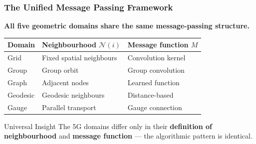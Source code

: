 \begin{frame}[fragile]\frametitle{The Unified Message Passing Framework}

\begin{center}
\textbf{All five geometric domains share the same message-passing structure.}
\end{center}

\begin{center}
\begin{tabular}{lll}
\hline
\textbf{Domain} & \textbf{Neighbourhood $\mathcal{N}(i)$} & \textbf{Message function $M$} \\
\hline
Grid & Fixed spatial neighbours & Convolution kernel \\
Group & Group orbit & Group convolution \\
Graph & Adjacent nodes & Learned function \\
Geodesic & Geodesic neighbours & Distance-based \\
Gauge & Parallel transport & Gauge connection \\
\hline
\end{tabular}
\end{center}

\begin{alertblock}{Universal Insight}
The 5G domains differ only in their \textbf{definition of neighbourhood} and \textbf{message function} --- the algorithmic pattern is identical.
\end{alertblock}

\end{frame}

